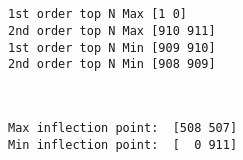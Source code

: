 \documentclass[11pt]{article}
\begin{document}
    \begin{center}
    \end{center}
    { \hspace*{\fill} \\}
    
    \begin{center}
    \end{center}
    { \hspace*{\fill} \\}
    
    \begin{Verbatim}[commandchars=\\\{\}]
1st order top N Max [1 0]
2nd order top N Max [910 911]
1st order top N Min [909 910]
2nd order top N Min [908 909]

    \end{Verbatim}

    \begin{center}
    \end{center}
    { \hspace*{\fill} \\}
    
    \begin{Verbatim}[commandchars=\\\{\}]
Max inflection point:  [508 507]
Min inflection point:  [  0 911]

    \end{Verbatim}

    \begin{center}
    \end{center}
    { \hspace*{\fill} \\}
    
    \begin{center}
    \end{center}
    { \hspace*{\fill} \\}
    
    \begin{center}
    \end{center}
    { \hspace*{\fill} \\}
    
\end{document}
